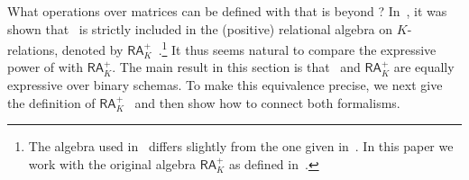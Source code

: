 %
%
%

What operations over matrices can be defined with \langsum that is beyond \lang? In~\cite{brijder2019matrices}, it was shown that \lang\ is strictly included in the (positive) relational algebra on $K$-relations, denoted by $\mathsf{RA}_{K}^+$~\cite{GreenKT07}.\footnote{The algebra used in~\cite{brijder2019matrices} differs slightly from the one given in~\cite{GreenKT07}. In this paper we work with the original algebra $\mathsf{RA}_{K}^+$ as defined in~\cite{GreenKT07}.} 
%
%
It thus seems natural to compare the expressive power of \langsum with $\mathsf{RA}_{K}^+$. 
The main result in this section is that \langsum\ and $\mathsf{RA}_{K}^+$ 
are equally expressive over binary schemas. 
To make this equivalence precise, we next give the 
definition of $\mathsf{RA}_{K}^+$~\cite{GreenKT07} and then show how to connect both formalisms.

